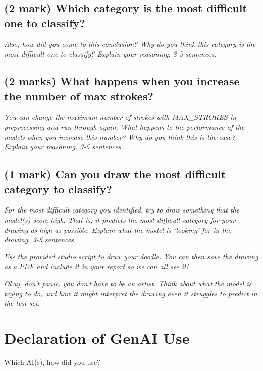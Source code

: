 \documentclass[11pt,a4paper]{article}
\begin{document}
\subsection{(2 mark) Which category is the most difficult one to classify?}\label{p1_report_hardest_category}

\textit{Also, how did you come to this conclusion? Why do you think this category is the most difficult one to classify? Explain your reasoning. 3-5 sentences.}

\subsection{(2 marks) What happens when you increase the number of max strokes?}\label{p1_report_max_strokes}

\textit{You can change the maximum number of strokes with MAX\_STROKES in preprocessing and run through again. What happens to the performance of the models when you increase this number? Why do you think this is the case? Explain your reasoning. 3-5 sentences.}

\subsection{(1 mark) Can you draw the most difficult category to classify?}\label{p1_report_draw_hardest}

\textit{For the most difficult category you identified, try to draw something that the model(s) score high. That is, it predicts the most difficult category for your drawing as high as possible. Explain what the model is 'looking' for in the drawing. 3-5 sentences.}

\textit{Use the provided studio script to draw your doodle. You can then save the drawing as a PDF and include it in your report so we can all see it!}

\textit{Okay, don't panic, you don't have to be an artist. Think about what the model is trying to do, and how it might interpret the drawing even it struggles to predict in the test set.}

\section*{Declaration of GenAI Use}

Which AI(s), how did you use?
\end{document}
